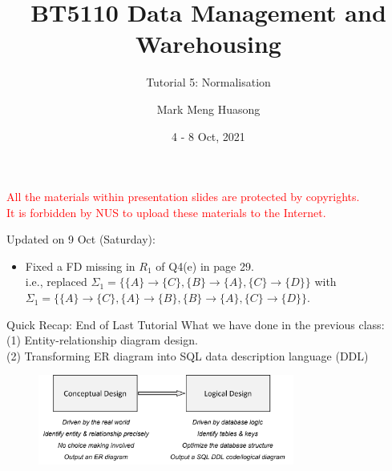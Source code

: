 \title{BT5110 Data Management and Warehousing}

\subtitle{Tutorial 5: Normalisation}

\author{Mark Meng Huasong}



\date{4 - 8 Oct, 2021}

\begin{frame}
	\titlepage
	\begin{tcolorbox}
		\begin{center}
			{\scriptsize \textcolor{red}{All the materials within presentation slides are protected by copyrights.\\
					It is forbidden by NUS to upload these materials to the Internet.}}
		\end{center}
	\end{tcolorbox}
\end{frame}

\begin{frame}
	Updated on 9 Oct (Saturday):
	\begin{itemize}
		\item Fixed a FD missing in $R_1$ of Q4(e) in page 29.\\
		i.e., replaced $\Sigma_1 = \{\{A\} \rightarrow \{C\}, \{B\} \rightarrow \{A\}, \{C\} \rightarrow \{D\}\}$ with $\Sigma_1 = \{\{A\} \rightarrow \{C\}, \{A\} \rightarrow \{B\},\{B\} \rightarrow \{A\}, \{C\} \rightarrow \{D\}\}$.
	\end{itemize}
\end{frame}

\begin{frame}[fragile]{Quick Recap: End of Last Tutorial}
	What we have done in the previous class:\\\vspace{5pt}
	(1) Entity-relationship diagram design. \\
	(2) Transforming ER diagram into SQL data description language (DDL)\\\vspace{5pt}
	\begin{figure}
		\includegraphics[width=0.75\textwidth, trim=0 0 0 0, clip]{t5/images/steps.png}
	\end{figure}
\end{frame}


